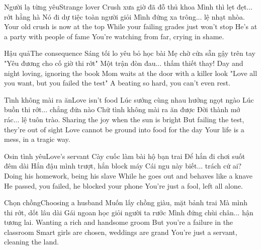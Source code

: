 \begin{tutuyetbox}{Người lạ từng yêu}{Strange lover}
Crush xưa giờ đã đỗ thủ khoa
Mình thì lẹt đẹt... rớt hằng hà
Nó đi dự tiệc toàn người giỏi
Mình đứng xa trông... lệ nhạt nhòa.
\tcblower
Your old crush is now at the top
While your failing grades just won't stop
He's at a party with people of fame
You're watching from far, crying in shame.
\end{tutuyetbox}

\begin{tutuyetbox}{Hậu quả}{The consequence}
Sáng tối lo yêu bỏ học bài
Mẹ chờ cửa sẵn gậy trên tay
"Yêu đương cho cố giờ thi rớt"
Một trận đòn đau... thấm thiết thay!
\tcblower
Day and night loving, ignoring the book
Mom waits at the door with a killer look
"Love all you want, but you failed the test"
A beating so hard, you can't even rest.
\end{tutuyetbox}

\begin{tutuyetbox}{Tình không mài ra ăn}{Love isn't food}
Lúc sướng cùng nhau hưởng ngọt ngào
Lúc buồn thi rớt... chẳng đứa nào
Chữ tình không mài ra ăn được
Đời thành mớ rác... lệ tuôn trào.
\tcblower
Sharing the joy when the sun is bright
But failing the test, they're out of sight
Love cannot be ground into food for the day
Your life is a mess, in a tragic way.
\end{tutuyetbox}

\begin{tutuyetbox}{Osin tình yêu}{Love's servant}
Cày cuốc làm bài hộ bạn trai
Để hắn đi chơi suốt đêm dài
Hắn đậu mình trượt, hắn block máy
Cái ngu này biết... trách cứ ai?
\tcblower
Doing his homework, being his slave
While he goes out and behaves like a knave
He passed, you failed, he blocked your phone
You're just a fool, left all alone.
\end{tutuyetbox}

\begin{tutuyetbox}{Chọn chồng}{Choosing a husband}
Muốn lấy chồng giàu, mặt bảnh trai
Mà mình thi rớt, dốt lâu dài
Gái ngoan học giỏi người ta rước
Mình đứng chùi chân... hận tương lai.
\tcblower
Wanting a rich and handsome groom
But you're a failure in the classroom
Smart girls are chosen, weddings are grand
You're just a servant, cleaning the land.
\end{tutuyetbox}

